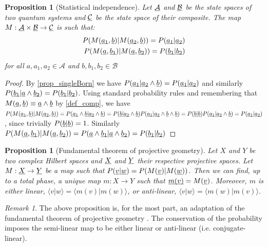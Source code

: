 \documentclass[aps,prl,amsmath,amssymb,twocolumn,nofootinbib]{revtex4}
\theoremstyle{plain}
\newtheorem{prop}[thrm]{Proposition}
\theoremstyle{definition}
\theoremstyle{remark}
\newtheorem*{remark}{Remark}
\newcommand{\pj}[1] {\underbar{$#1$}}
\def\>{\rangle}
\def\<{\langle}
\begin{document}
	\begin{prop}[Statistical independence]\label{prop_statInd}
		Let $\pj{\mathcal{A}}$ and $\pj{\mathcal{B}}$ be the state spaces of two quantum systems and $\pj{\mathcal{C}}$ be the state space of their composite. The map $M : \pj{\mathcal{A}} \times \pj{\mathcal{B}} \to \pj{\mathcal{C}}$ is such that:
		\begin{align}
		P(M(\pj{a_1},\pj{b}) | M(\pj{a_2},\pj{b})) = P(\pj{a_1} | \pj{a_2})  \\ P(M(\pj{a},\pj{b_1}) | M(\pj{a},\pj{b_2})) = P(\pj{b_1} | \pj{b_2})
		\end{align}
		for all $a, a_1, a_2 \in \mathcal{A}$ and $b, b_1, b_2 \in \mathcal{B}$
	\end{prop}
	\begin{proof}
		By \ref{prop_singleBorn} we have $P(\pj{a_1} | \pj{a_2} \wedge \pj{b}) = P(\pj{a_1} | \pj{a_2})$ and similarly $P(\pj{b_1} | \pj{a} \wedge \pj{b_2}) = P(\pj{b_1} | \pj{b_2})$.  Using standard probability rules and remembering that $M(\pj{a},\pj{b})\equiv \pj{a} \wedge \pj{b}$ by \ref{def_comp}, we have $P(M(\pj{a_1},\pj{b}) | M(\pj{a_2},\pj{b})) = P(\pj{a_1} \wedge \pj{b} | \pj{a_2} \wedge \pj{b})  = P(\pj{b} | \pj{a_2} \wedge \pj{b}) P(\pj{a_1} | \pj{a_2} \wedge \pj{b} \wedge \pj{b})  = P(\pj{b} | \pj{b}) P(\pj{a_1} | \pj{a_2} \wedge \pj{b}) = P(\pj{a_1} | \pj{a_2})$, since trivially $P(\pj{b}|\pj{b})=1$. Similarly $P(M(\pj{a},\pj{b_1}) | M(\pj{a},\pj{b_2})) =P(\pj{a} \wedge \pj{b_1} | \pj{a} \wedge \pj{b_2}) = P(\pj{b_1} | \pj{b_2})$
	\end{proof}
	
	\begin{prop}[Fundamental theorem of projective geometry]\label{prop_fundProj}
		Let $X$ and $Y$ be two complex Hilbert spaces and $\pj{X}$ and $\pj{Y}$ their respective projective spaces. Let $M : \pj{X} \to \pj{Y}$ be a map such that $P(\pj{v}|\pj{w}) = P(M(\pj{v})|M(\pj{w}))$. Then we can find, up to a total phase, a unique map $m : X \to Y$ such that $\pj{m(v)}=M(\pj{v})$. Moreover, $m$ is either linear, $\<v|w\> = \<m(v)|m(w)\>$, or anti-linear, $\<v|w\> = \<m(w)|m(v)\>$.
	\end{prop}
	
	\begin{remark}
		The above proposition is, for the most part, an adaptation of the fundamental theorem of projective geometry \cite{fun}. The conservation of the probability imposes the semi-linear map to be either linear or anti-linear (i.e. conjugate-linear).
	\end{remark}
	
\end{document}
